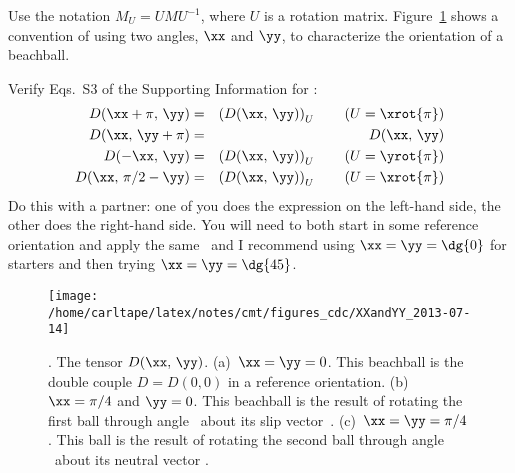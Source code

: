 \documentclass[11pt,titlepage,fleqn]{article}
\newcommand{\bvec}{\textcolor{blue}{\mbb}}
\newcommand{\svec}{\mbs}
\begin{document}
%
Use the notation $M_U=UMU^{-1}$, where $U$ is a rotation matrix. Figure~\ref{fig:XXandYY} shows a convention of using two angles, $\xx$ and $\yy$, to characterize the orientation of a beachball.

Verify Eqs.~S3 of the Supporting Information for \citet{TapeTape2013}:
%
\begin{eqnarray}
D(\xx+\pi,\,\yy)&=&\left(D(\xx,\,\yy)\right)_U\hspace{20pt}(U=\xrot{\pi})
\label{eq1}
\\
D(\xx,\,\yy+\pi)&=&D(\xx,\,\yy)
\label{eq2}
\\
D(-\xx,\,\yy)&=&\left(D(\xx,\,\yy)\right)_U\hspace{20pt}(U=\yrot{\pi})
\label{eq3}
\\
D(\xx,\,\pi/2-\yy)&=&\left(D(\xx,\,\yy)\right)_U\hspace{20pt}(U=\xrot{\pi})
\label{eq4}
\end{eqnarray}
%
Do this with a partner: one of you does the expression on the left-hand side, the other does the right-hand side. You will need to both start in some reference orientation and apply the same \xx\ and \yy\; I recommend using $\xx=\yy=\dg{0}$ for starters and then trying $\xx=\yy=\dg{45}$.


\begin{figure}[h]
\center
\texttt{[image: /home/carltape/latex/notes/cmt/figures\_cdc/XXandYY\_2013-07-14]}
\caption{
\citep[Figure~8 of][]{TapeTape2013}. The tensor $D(\xx,\,\yy)$.
(a)~$\xx=\yy=0$. This beachball is the double couple $D=D(0,0)$ in a reference orientation.
(b)~$\xx=\pi/4$ and $\yy=0$. This beachball is the result of rotating the first ball through angle \xx\ about its slip vector~\svec.
(c)~$\xx=\yy=\pi/4$. This ball is the result of rotating the second ball through angle \yy\ about its neutral vector \bvec.
\label{fig:XXandYY}
}
\end{figure}




\end{document}
